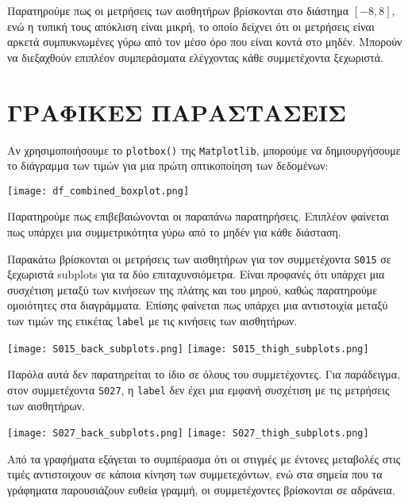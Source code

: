         Παρατηρούμε πως οι μετρήσεις των αισθητήρων βρίσκονται στο διάστημα \( [-8, 8]\), ενώ η τυπική τους απόκλιση είναι μικρή,
        το οποίο δείχνει ότι οι μετρήσεις είναι αρκετά συμπυκνωμένες γύρω από τον μέσο όρο που είναι κοντά στο μηδέν.
        Μπορούν να διεξαχθούν επιπλέον συμπεράσματα ελέγχοντας κάθε συμμετέχοντα ξεχωριστά.

    \section{ΓΡΑΦΙΚΕΣ ΠΑΡΑΣΤΑΣΕΙΣ}

        Aν χρησιμοποιήσουμε το \texttt{plotbox()} της \texttt{Matplotlib}, μπορούμε να δημιουργήσουμε
        το διάγραμμα των τιμών για μια πρώτη οπτικοποίηση των δεδομένων:

        \begin{center}
            \texttt{[image: df\_combined\_boxplot.png]}
        \end{center}

        Παρατηρούμε πως επιβεβαιώνονται οι παραπάνω παρατηρήσεις. Επιπλέον φαίνεται πως υπάρχει μια συμμετρικότητα γύρω από το μηδέν
        για κάθε διάσταση.

        Παρακάτω βρίσκονται οι μετρήσεις των αισθητήρων για τον συμμετέχοντα \texttt{S015} σε ξεχωριστά subplots για τα δύο επιταχυνσιόμετρα.
        Είναι προφανές ότι υπάρχει μια συσχέτιση μεταξύ των κινήσεων της πλάτης και του μηρού, καθώς παρατηρούμε ομοιότητες στα διαγράμματα.
        Επίσης φαίνεται πως υπάρχει μια αντιστοιχία μεταξύ των τιμών της ετικέτας \texttt{label} με τις κινήσεις των αισθητήρων.

        \pagebreak

        \begin{multicols}{2} \centering
            \noindent\texttt{[image: S015\_back\_subplots.png]}
            \texttt{[image: S015\_thigh\_subplots.png]}
        \end{multicols}

        Παρόλα αυτά δεν παρατηρείται το ίδιο σε όλους του συμμετέχοντες. Για παράδειγμα, στον συμμετέχοντα \texttt{S027},
        η \texttt{label} δεν έχει μια εμφανή συσχέτιση με τις μετρήσεις των αισθητήρων.

        \begin{multicols}{2} \centering
            \noindent\texttt{[image: S027\_back\_subplots.png]}
            \texttt{[image: S027\_thigh\_subplots.png]}
        \end{multicols}

        Από τα γραφήματα εξάγεται το συμπέρασμα ότι οι στιγμές με έντονες μεταβολές στις τιμές αντιστοιχουν σε κάποια κίνηση των συμμετεχόντων,
        ενώ στα σημεία που τα γράφηματα παρουσιάζουν ευθεία γραμμή, οι συμμετέχοντες βρίσκονται σε αδράνεια.

